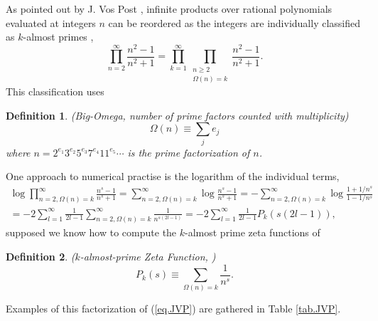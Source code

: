 \documentclass{amsart}
\newtheorem{defn}{Definition}
\begin{document}
As pointed out by J. Vos Post \cite{Vospost112407},
infinite products over rational polynomials
evaluated at integers $n$ can be reordered as the integers are individually
classified as $k$-almost primes \cite{BorweinAMM106}\cite[\S 1.2]{BorweinExpMath},
\begin{equation}
\prod_{n=2}^\infty \frac{n^2-1}{n^2+1}
=
\prod_{k=1}^\infty
\prod_{\substack{n\ge 2\\ \Omega(n)=k}} \frac{n^2-1}{n^2+1}
\label{eq.JVP}
.
\end{equation}
This classification uses
\begin{defn} (Big-Omega, number of prime factors counted with multiplicity)
\begin{equation}
\Omega(n)\equiv \sum_j e_j
\end{equation}
where $n=2^{e_1}3^{e_2}5^{e_3}7^{e_4}11^{e_5}\cdots$ is the prime factorization of $n$.
\end{defn}
One approach to numerical practise is the logarithm of the individual terms,
\cite[1.513.1]{GR}
\begin{gather}
\log \prod_{n=2,\Omega(n)=k}^\infty \frac{n^s-1}{n^s+1}
=
\sum_{n=2,\Omega(n)=k}^\infty \log\frac{n^s-1}{n^s+1}
=
- \sum_{n=2,\Omega(n)=k}^\infty \log\frac{1+1/n^s}{1-1/n^s}
\label{eq.logcycl}
\\
=
-2 \sum_{l=1}^\infty \frac{1}{2l-1}\sum_{n=2,\Omega(n)=k}^\infty \frac{1}{n^{s(2l-1)}}
\nonumber
=
-2 \sum_{l=1}^\infty \frac{1}{2l-1}P_k(s(2l-1)),
\end{gather}
supposed we know how to compute 
the $k$-almost prime zeta functions of
\begin{defn} ($k$-almost-prime Zeta Function, \cite{MatharArxiv0803})
\begin{equation}
P_k(s)\equiv \sum_{\Omega(n)=k} \frac{1}{n^s}.
\label{eq.P1}
\end{equation}
\end{defn}
Examples of this factorization of (\ref{eq.JVP}) are gathered in Table \ref{tab.JVP}.
\end{document}
